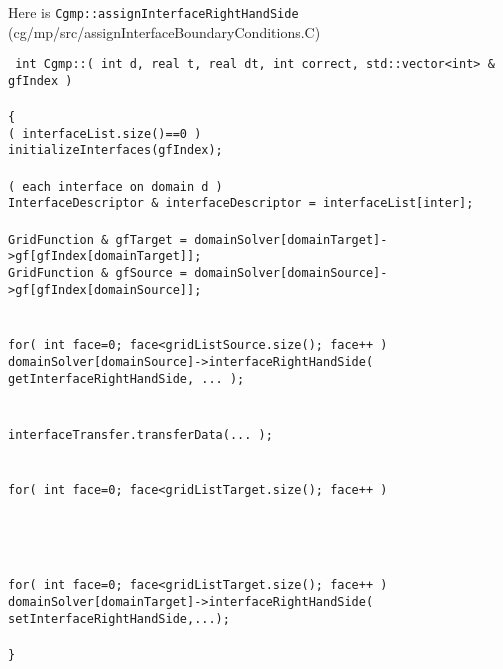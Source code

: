 \documentclass[11pt]{article}
\begin{document}
Here is {\tt Cgmp::assignInterfaceRightHandSide} (cg/mp/src/assignInterfaceBoundaryConditions.C)
\begin{flushleft}\tt\small
int Cgmp::( int d, real t, real dt, int correct, std::vector<int> \& gfIndex ) \\
 \\
\{  \\
\ia \IF( interfaceList.size()==0 ) \\
\ib     initializeInterfaces(gfIndex);  \\
\ib \\
\ia \FOR( each interface on domain d )\\
\ib    InterfaceDescriptor \& interfaceDescriptor = interfaceList[inter]; \\
\ib    {} \\
\ib    GridFunction \& gfTarget = domainSolver[domainTarget]->gf[gfIndex[domainTarget]]; \\
\ib    GridFunction \& gfSource = domainSolver[domainSource]->gf[gfIndex[domainSource]]; \\
\ib    \\
\ib    {} \\
\ib    for( int face=0; face<gridListSource.size(); face++ ) \\
\ic      domainSolver[domainSource]->interfaceRightHandSide( getInterfaceRightHandSide, ... ); \\
\ib     \\
\ib    {} \\
\ib    interfaceTransfer.transferData(... );  \\
\ib    \\
\ib    {} \\
\ib    for( int face=0; face<gridListTarget.size(); face++ ) \\
\ic      {} \\
\ic      {} \\
\ib    \\
\ib    {} \\
\ib    for( int face=0; face<gridListTarget.size(); face++ ) \\
\ic      domainSolver[domainTarget]->interfaceRightHandSide( setInterfaceRightHandSide,...); \\
\ia \\
\}
\end{flushleft}
\end{document}
